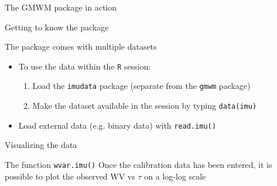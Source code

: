 \documentclass[envcountsect,usenames,dvipsnames]{beamer}
\theoremstyle{mystyle}
\begin{document}
\begin{frame}{The GMWM package in action}

\begin{block}{Getting to know the package}

The package comes with multiple datasets 
\begin{itemize}
    \item To use the data within the {\tt R} session:
    \begin{enumerate} 
        \item Load the {\tt imudata} package (separate from the {\tt gmwm} package)
        \item Make the dataset available in the session by typing {\tt data(imu)}
    \end{enumerate}
    \item Load external data (e.g. binary data) with {\tt read.imu()}
\end{itemize}
\end{block}

\end{frame}

\begin{frame}{Visualizing the data}

\begin{block}{The function {\tt wvar.imu()}}
Once the calibration data has been entered, it is possible to plot the observed WV vs $\tau$ on a log-log scale
\end{block}

	\begin{figure}
	  \centering
	\end{figure}
\end{frame}
\end{document}

